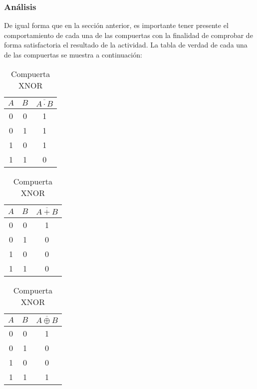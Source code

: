 \documentclass[../procedimientos.tex]{subfiles}
\begin{document}
\subsubsection{Análisis}
De igual forma que en la sección anterior, es importante tener presente el 
comportamiento de cada una de las compuertas con la finalidad de comprobar de 
forma satisfactoria el resultado de la actividad. La tabla de verdad de cada 
una de las compuertas se muestra a continuación:
\begin{table}[h!]
  \caption{Tablas de verdad (Sección B)}
  \label{tab:b_tv}
  \centering
  \begin{subtable}[t]{0.25\linewidth} %
    \centering
    \label{tab:comp_nand}
    \begin{tabular}{|c c|c|}
      \hline
      $A$ & $B$ & $\overline{A \cdot B}$\\
      \hline
      0 & 0 & 1\\
      0 & 1 & 1\\
      1 & 0 & 1\\
      1 & 1 & 0\\
      \hline
    \end{tabular}
    \caption{Compuerta NAND}
  \end{subtable}
  \begin{subtable}[t]{0.25\linewidth} %
    \centering
    \label{tab:comp_nor}
    \begin{tabular}{|c c|c|}
      \hline
      $A$ & $B$ & $\overline{A + B}$\\
      \hline
      0 & 0 & 1\\
      0 & 1 & 0\\
      1 & 0 & 0\\
      1 & 1 & 0\\
      \hline
    \end{tabular}
    \caption{Compuerta NOR}
  \end{subtable}
  \begin{subtable}[t]{0.25\linewidth} %
    \centering
    \label{tab:comp_xnor}
    \begin{tabular}{|c c|c|}
      \hline
      $A$ & $B$ & $\overline{A \oplus B}$\\
      \hline
      0 & 0 & 1\\
      0 & 1 & 0\\
      1 & 0 & 0\\
      1 & 1 & 1\\
      \hline
    \end{tabular}
    \caption{Compuerta XNOR}
  \end{subtable}
\end{table}
\end{document}

